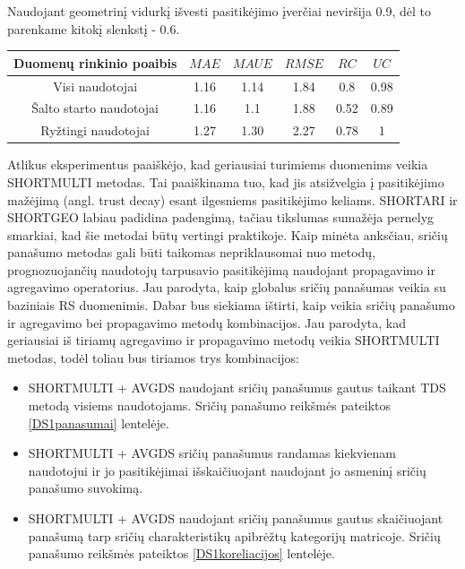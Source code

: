 \documentclass{VUMIFInfMagistrinis}
\begin{document}
Naudojant geometrinį vidurkį išvesti pasitikėjimo įverčiai neviršija 0.9, dėl to parenkame kitokį slenkstį - $0.6$. 
\begin{center}
	\begin{tabular}{||c c c c c c||} 
		Duomenų rinkinio poaibis & $MAE$ & $MAUE$ & $RMSE$ & $RC$ & $UC$ \\
		\hline
		Visi naudotojai & 1.16 & 1.14 & 1.84 & 0.8 & 0.98 \\
		\hline
		Šalto starto naudotojai & 1.16 & 1.1 & 1.88 & 0.52 & 0.89 \\
		\hline
		Ryžtingi naudotojai & 1.27 & 1.30 & 2.27 & 0.78 & 1 \\
	\end{tabular}
\end{center}
\indent
Atlikus eksperimentus paaiškėjo, kad geriausiai turimiems duomenims veikia SHORTMULTI metodas. Tai paaiškinama tuo, kad jis atsižvelgia į pasitikėjimo mažėjimą (angl. trust decay) esant ilgesniems pasitikėjimo keliams. SHORTARI ir SHORTGEO labiau padidina padengimą, tačiau tikslumas sumažėja pernelyg smarkiai, kad šie metodai būtų vertingi praktikoje.
\newline
\indent
Kaip minėta anksčiau, sričių panašumo metodas gali būti taikomas nepriklausomai nuo metodų, prognozuojančių naudotojų tarpusavio pasitikėjimą naudojant propagavimo ir agregavimo operatorius. Jau parodyta, kaip globalus sričių panašumas veikia su baziniais RS duomenimis. Dabar bus siekiama ištirti, kaip veikia sričių panašumo ir agregavimo bei propagavimo metodų kombinacijos. Jau parodyta, kad geriausiai iš tiriamų agregavimo ir propagavimo metodų veikia SHORTMULTI metodas, todėl toliau bus tiriamos trys kombinacijos:
\begin{itemize}
	\item  SHORTMULTI + AVGDS naudojant sričių panašumus gautus taikant TDS metodą visiems naudotojams. Sričių panašumo reikšmės pateiktos \ref{DS1panasumai} lentelėje.
	\item  SHORTMULTI + AVGDS sričių panašumus randamas kiekvienam naudotojui ir jo pasitikėjimai išskaičiuojant naudojant jo asmeninį sričių panašumo suvokimą.
	\item  SHORTMULTI + AVGDS naudojant sričių panašumus gautus skaičiuojant panašumą tarp sričių charakteristikų apibrėžtų kategorijų matricoje. Sričių panašumo reikšmės pateiktos \ref{DS1koreliacijos} lentelėje.
	
\end{itemize}
\end{document}
